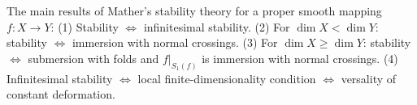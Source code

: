 The main results of Mather's stability theory for a proper smooth mapping $f: X \to Y$:
(1) Stability $\Leftrightarrow$ infinitesimal stability.
(2) For $\dim X < \dim Y$: stability $\Leftrightarrow$ immersion with normal crossings.
(3) For $\dim X \geq \dim Y$: stability $\Leftrightarrow$ submersion with folds and $f|_{S_1(f)}$ is immersion with normal crossings.
(4) Infinitesimal stability $\Leftrightarrow$ local finite-dimensionality condition $\Leftrightarrow$ versality of constant deformation.
